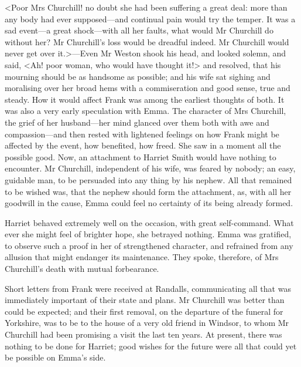 <Poor Mrs Churchill! no doubt she had been suffering a great deal: more than any body had ever supposed—and continual pain would try the temper. It was a sad event—a great shock—with all her faults, what would Mr Churchill do without her? Mr Churchill's loss would be dreadful indeed. Mr Churchill would never get over it.>—Even Mr Weston shook his head, and looked solemn, and said, <Ah! poor woman, who would have thought it!> and resolved, that his mourning should be as handsome as possible; and his wife sat sighing and moralising over her broad hems with a commiseration and good sense, true and steady. How it would affect Frank was among the earliest thoughts of both. It was also a very early speculation with Emma. The character of Mrs Churchill, the grief of her husband—her mind glanced over them both with awe and compassion—and then rested with lightened feelings on how Frank might be affected by the event, how benefited, how freed. She saw in a moment all the possible good. Now, an attachment to Harriet Smith would have nothing to encounter. Mr Churchill, independent of his wife, was feared by nobody; an easy, guidable man, to be persuaded into any thing by his nephew. All that remained to be wished was, that the nephew should form the attachment, as, with all her goodwill in the cause, Emma could feel no certainty of its being already formed.

Harriet behaved extremely well on the occasion, with great self-command. What ever she might feel of brighter hope, she betrayed nothing. Emma was gratified, to observe such a proof in her of strengthened character, and refrained from any allusion that might endanger its maintenance. They spoke, therefore, of Mrs Churchill's death with mutual forbearance.

Short letters from Frank were received at Randalls, communicating all that was immediately important of their state and plans. Mr Churchill was better than could be expected; and their first removal, on the departure of the funeral for Yorkshire, was to be to the house of a very old friend in Windsor, to whom Mr Churchill had been promising a visit the last ten years. At present, there was nothing to be done for Harriet; good wishes for the future were all that could yet be possible on Emma's side.

